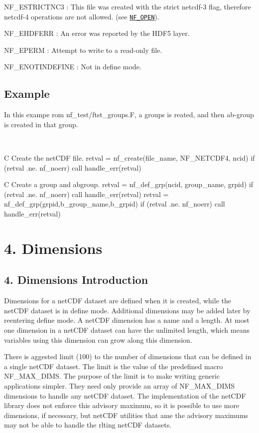 {\ttfamily N\+F\+\_\+\+E\+S\+T\+R\+I\+C\+T\+N\+C3} \+: This file was created with the strict netcdf-\/3 flag, therefore netcdf-\/4 operations are not allowed. (see \href{#NF_005fOPEN}{\tt N\+F\+\_\+\+O\+P\+EN}).

{\ttfamily N\+F\+\_\+\+E\+H\+D\+F\+E\+RR} \+: An error was reported by the H\+D\+F5 layer.

{\ttfamily N\+F\+\_\+\+E\+P\+E\+RM} \+: Attempt to write to a read-\/only file.

{\ttfamily N\+F\+\_\+\+E\+N\+O\+T\+I\+N\+D\+E\+F\+I\+NE} \+: Not in define mode.

\subsection*{Example }

In this exampe rom nf\+\_\+test/ftst\+\_\+groups.\+F, a groups is reated, and then ab-\/group is created in that group.

 

C Create the net\+C\+DF file. retval = nf\+\_\+create(file\+\_\+name, N\+F\+\_\+\+N\+E\+T\+C\+D\+F4, ncid) if (retval .ne. nf\+\_\+noerr) call handle\+\_\+err(retval)

C Create a group and abgroup. retval = nf\+\_\+def\+\_\+grp(ncid, group\+\_\+name, grpid) if (retval .ne. nf\+\_\+noerr) call handle\+\_\+err(retval) retval = nf\+\_\+def\+\_\+grp(grpid,b\+\_\+group\+\_\+name,b\+\_\+grpid) if (retval .ne. nf\+\_\+noerr) call handle\+\_\+err(retval)\hypertarget{nc_f77_interface_guide_f77_Dimensions}{}\section{4. Dimensions }\label{nc_f77_interface_guide_f77_Dimensions}
\hypertarget{nc_f77_interface_guide_f77_Dimensions-Introduction}{}\subsection{4. Dimensions Introduction }\label{nc_f77_interface_guide_f77_Dimensions-Introduction}
Dimensions for a net\+C\+DF dataset are defined when it is created, while the net\+C\+DF dataset is in define mode. Additional dimensions may be added later by reentering define mode. A net\+C\+DF dimension has a name and a length. At most one dimension in a net\+C\+DF dataset can have the unlimited length, which means variables using this dimension can grow along this dimension.

There is aggested limit (100) to the number of dimensions that can be defined in a single net\+C\+DF dataset. The limit is the value of the predefined macro N\+F\+\_\+\+M\+A\+X\+\_\+\+D\+I\+MS. The purpose of the limit is to make writing generic applications simpler. They need only provide an array of N\+F\+\_\+\+M\+A\+X\+\_\+\+D\+I\+MS dimensions to handle any net\+C\+DF dataset. The implementation of the net\+C\+DF library does not enforce this advisory maximum, so it is possible to use more dimensions, if necessary, but net\+C\+DF utilities that ame the advisory maximums may not be able to handle the rlting net\+C\+DF datasets.

